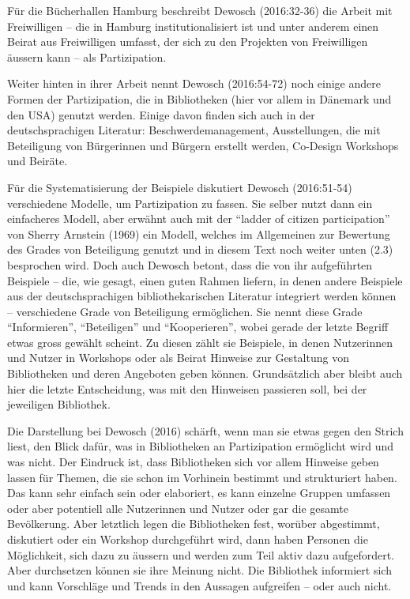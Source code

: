 \documentclass[a4paper,
fontsize=11pt,
oneside,
numbers=noperiodatend,
parskip=half-,
bibliography=totoc,
final
]{scrartcl}
\begin{document}
Für die Bücherhallen Hamburg beschreibt Dewosch (2016:32-36) die Arbeit
mit Freiwilligen -- die in Hamburg institutionalisiert ist und unter
anderem einen Beirat aus Freiwilligen umfasst, der sich zu den Projekten
von Freiwilligen äussern kann -- als Partizipation.

Weiter hinten in ihrer Arbeit nennt Dewosch (2016:54-72) noch einige
andere Formen der Partizipation, die in Bibliotheken (hier vor allem in
Dänemark und den USA) genutzt werden. Einige davon finden sich auch in
der deutschsprachigen Literatur: Beschwerdemanagement, Ausstellungen,
die mit Beteiligung von Bürgerinnen und Bürgern erstellt werden,
Co-Design Workshops und Beiräte.

Für die Systematisierung der Beispiele diskutiert Dewosch (2016:51-54)
verschiedene Modelle, um Partizipation zu fassen. Sie selber nutzt dann
ein einfacheres Modell, aber erwähnt auch mit der \enquote{ladder of
citizen participation} von Sherry Arnstein (1969) ein Modell, welches im
Allgemeinen zur Bewertung des Grades von Beteiligung genutzt und in
diesem Text noch weiter unten (2.3) besprochen wird. Doch auch Dewosch
betont, dass die von ihr aufgeführten Beispiele -- die, wie gesagt,
einen guten Rahmen liefern, in denen andere Beispiele aus der
deutschsprachigen bibliothekarischen Literatur integriert werden können
-- verschiedene Grade von Beteiligung ermöglichen. Sie nennt diese Grade
\enquote{Informieren}, \enquote{Beteiligen} und \enquote{Kooperieren},
wobei gerade der letzte Begriff etwas gross gewählt scheint. Zu diesen
zählt sie Beispiele, in denen Nutzerinnen und Nutzer in Workshops oder
als Beirat Hinweise zur Gestaltung von Bibliotheken und deren Angeboten
geben können. Grundsätzlich aber bleibt auch hier die letzte
Entscheidung, was mit den Hinweisen passieren soll, bei der jeweiligen
Bibliothek.

Die Darstellung bei Dewosch (2016) schärft, wenn man sie etwas gegen den
Strich liest, den Blick dafür, was in Bibliotheken an Partizipation
ermöglicht wird und was nicht. Der Eindruck ist, dass Bibliotheken sich
vor allem Hinweise geben lassen für Themen, die sie schon im Vorhinein
bestimmt und strukturiert haben. Das kann sehr einfach sein oder
elaboriert, es kann einzelne Gruppen umfassen oder aber potentiell alle
Nutzerinnen und Nutzer oder gar die gesamte Bevölkerung. Aber letztlich
legen die Bibliotheken fest, worüber abgestimmt, diskutiert oder ein
Workshop durchgeführt wird, dann haben Personen die Möglichkeit, sich
dazu zu äussern und werden zum Teil aktiv dazu aufgefordert. Aber
durchsetzen können sie ihre Meinung nicht. Die Bibliothek informiert
sich und kann Vorschläge und Trends in den Aussagen aufgreifen -- oder
auch nicht.
\end{document}
